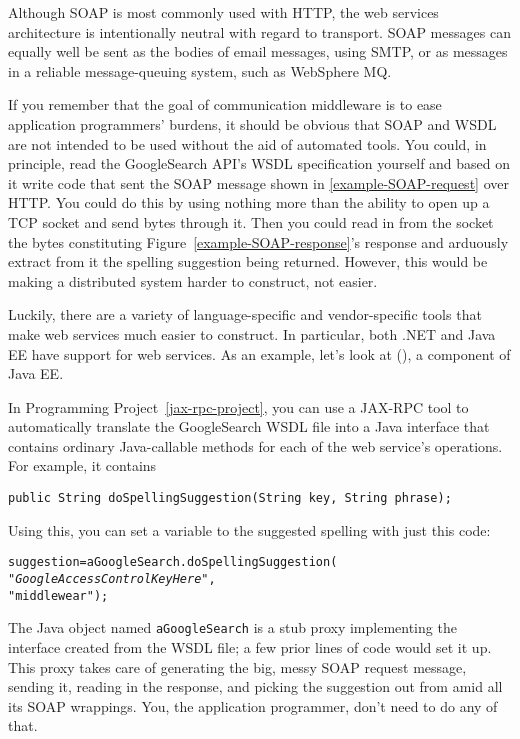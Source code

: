 Although SOAP is most commonly used with HTTP, the web services
architecture is intentionally neutral with regard to transport.  SOAP
messages can equally well be sent as the bodies of email messages,
using SMTP, or as messages in a reliable message-queuing system, such
as WebSphere MQ.

If you remember that the goal of communication middleware is to ease
application programmers' burdens, it should be obvious that SOAP and
WSDL are not intended to be used without the aid of automated tools.
You could, in principle, read the GoogleSearch API's WSDL specification
yourself and based on it write code that sent the SOAP message
shown in \ref{example-SOAP-request} over HTTP.  You could do this by using nothing more than
the ability to open up a TCP socket and send bytes through it. Then
you could read in from the socket the bytes constituting
Figure~\ref{example-SOAP-response}'s response and arduously extract
from it the spelling suggestion being returned.  However, this would
be making a distributed system harder to construct, not easier.

Luckily, there are a variety of language-specific and vendor-specific
tools that make web services much easier to construct.  In particular,
both .NET and Java EE have support for web services.  As an example, let's
look at  (), a component of
Java EE.

In Programming Project~\ref{jax-rpc-project}, you can use a JAX-RPC
tool to automatically translate the
GoogleSearch WSDL file into a Java interface that contains
ordinary Java-callable methods for each of the web service's
operations.  For example, it contains
\begin{verbatim}
public String doSpellingSuggestion(String key, String phrase);
\end{verbatim}
Using this, you can set a variable to the suggested spelling with
just this code:
\begin{alltt}
suggestion = aGoogleSearch.doSpellingSuggestion(
                           "\textrm{\textit{GoogleAccessControlKeyHere}}",
                           "middlewear");
\end{alltt}
The Java object named \verb|aGoogleSearch| is a stub proxy
implementing the interface created from the WSDL file; a few prior
lines of code would set it up.  This proxy
takes care of generating the big, messy SOAP request message,
sending it, reading in the response, and picking the suggestion out
from amid all its SOAP wrappings.  You, the application programmer,
don't need to do any of that.

